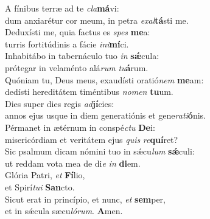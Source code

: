 \evenverse A fínibus terræ ad te \textit{cla}\textbf{má}vi:~\*\\
\evenverse dum anxiarétur cor meum, in petra \textit{e}\textit{xal}\textbf{tá}sti me.\\
\oddverse Deduxísti me, quia factus es \textit{spes} \textbf{me}a:~\*\\
\oddverse turris fortitúdinis a fácie \textit{i}\textit{ni}\textbf{mí}ci.\\
\evenverse Inhabitábo in tabernáculo tuo \textit{in} \textbf{sǽ}cula:~\*\\
\evenverse prótegar in velaménto alá\textit{rum} \textit{tu}\textbf{á}rum.\\
\oddverse Quóniam tu, Deus meus, exaudísti oratió\textit{nem} \textbf{me}am:~\*\\
\oddverse dedísti hereditátem timéntibus \textit{no}\textit{men} \textbf{tu}um.\\
\evenverse Dies super dies regis \textit{ad}\textbf{jí}cies:~\*\\
\evenverse annos ejus usque in diem generatiónis et gene\textit{ra}\textit{ti}\textbf{ó}nis.\\
\oddverse Pérmanet in ætérnum in conspé\textit{ctu} \textbf{De}i:~\*\\
\oddverse misericórdiam et veritátem ejus \textit{quis} \textit{re}\textbf{quí}ret?\\
\evenverse Sic psalmum dicam nómini tuo in sǽcu\textit{lum} \textbf{sǽ}culi:~\*\\
\evenverse ut reddam vota mea de di\textit{e} \textit{in} \textbf{di}em.\\
\oddverse Glória Patri, \textit{et} \textbf{Fí}lio,~\*\\
\oddverse et Spirí\textit{tu}\textit{i} \textbf{San}cto.\\
\evenverse Sicut erat in princípio, et nunc, \textit{et} \textbf{sem}per,~\*\\
\evenverse et in sǽcula sæcu\textit{ló}\textit{rum}. \textbf{A}men.\\
